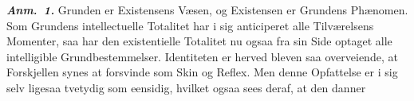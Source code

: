 \documentclass[12pt]{book}
\newcommand{\anm}[1]{\emph{\textbf{Anm.~#1.}}}
\newcommand{\divrule}{\begin{center}%
  \rule{0.27\linewidth}{0.9pt}\\[1.6pt]\rule{0.22\linewidth}{0.4pt}\end{center}}
\newcommand{\secrule}{\begin{center}%
  \rule{0.20\linewidth}{0.4pt}\\[1.3pt]\rule{0.20\linewidth}{0.4pt}\end{center}}
\newcommand{\opage}[1]{\marginnote{\footnotesize\textit{[#1]}}}
\begin{document}
\anm{1} Grunden er Existensens Væsen, og Existensen er Grundens Phænomen. Som
Grundens intellectuelle Totalitet har i sig anticiperet alle Tilværelsens Momenter,
saa har den existentielle Totalitet nu ogsaa fra sin Side optaget alle intelligible
Grundbestemmelser. Identiteten er herved bleven saa overveiende, at Forskjellen synes
at forsvinde som Skin og Reflex. Men denne Opfattelse er i sig selv ligesaa tvetydig
som eensidig, hvilket ogsaa sees deraf, at den danner
\opage{133} %
\end{document}
